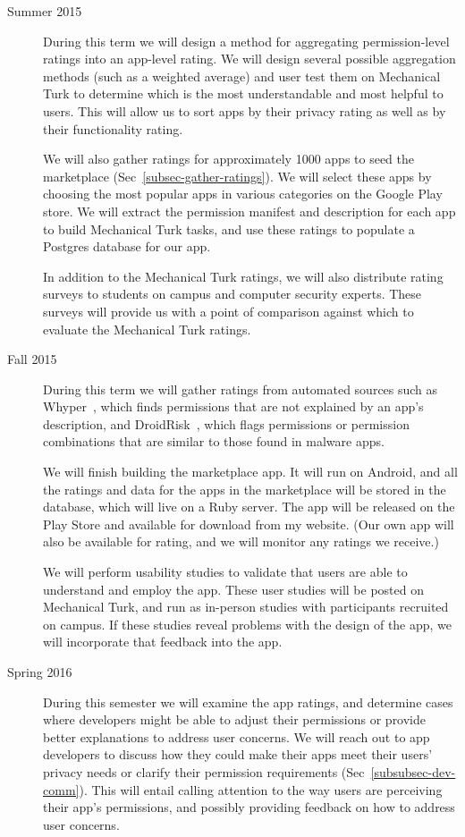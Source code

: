 \documentclass[11pt]{article}
\begin{document}
\begin{description}

\item[Summer 2015]
During this term we will design a method for aggregating 
permission-level ratings into an app-level rating. We will 
design several possible aggregation methods (such as a 
weighted average) and user test them on Mechanical
Turk to determine which is the most understandable and most
helpful to users. This will allow us to sort apps by their privacy 
rating as well as by their functionality rating.

We will also gather ratings for approximately 1000 apps to seed 
the marketplace (Sec~\ref{subsec-gather-ratings}). We will select these
apps by choosing the most popular apps in various categories on 
the Google Play store. We will extract the permission manifest and 
description for each app to build Mechanical Turk tasks, and 
use these ratings to populate a Postgres database 
for our app.

In addition to the Mechanical Turk ratings, we will also distribute
rating surveys to students on campus and computer security experts.
These surveys will provide us with a point of comparison against 
which to evaluate the Mechanical Turk ratings. 

\item[Fall 2015]

During this term we will gather ratings from automated sources 
such as Whyper~\cite{whyper-SEC13}, which finds permissions 
that are not explained by an app's description, and 
DroidRisk~\cite{droidrisk-2013}, which flags permissions or 
permission combinations that are similar to those found in 
malware apps.

We will finish building the marketplace app. It 
will run on Android, and all the ratings and data for the apps in
the marketplace will be 
stored in the database, which will live on a Ruby server. The app 
will be released on the Play Store and available for download 
from my website. (Our own app will also be available for rating, 
and we will monitor any ratings we receive.)

We will perform usability studies to validate that users are able 
to understand and employ the app. These user studies will be posted
on Mechanical Turk, and run as in-person studies with participants
recruited on campus. If these studies reveal problems with the 
design of the app, we will incorporate that feedback into the app.

\item[Spring 2016] 
During this semester we will examine the app ratings, and determine 
cases where developers might be able to adjust their permissions
or provide better explanations to address user concerns. We will 
reach out to app developers to discuss how they could make their 
apps meet their users' privacy needs or clarify their permission 
requirements (Sec~\ref{subsubsec-dev-comm}). 
This will entail calling attention to the way users are perceiving 
their app's permissions, and possibly providing feedback on how
to address user concerns.

\end{description}
\end{document}
